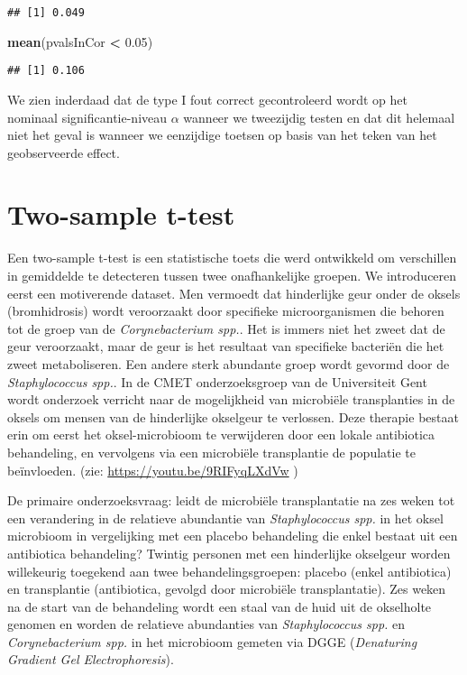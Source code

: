 \documentclass[12pt,dutch,coursenotes]{book}
\newenvironment{Shaded}{\begin{snugshade}}{\end{snugshade}}
\newcommand{\KeywordTok}[1]{\textcolor[rgb]{0.13,0.29,0.53}{\textbf{#1}}}
\newcommand{\FloatTok}[1]{\textcolor[rgb]{0.00,0.00,0.81}{#1}}
\newcommand{\StringTok}[1]{\textcolor[rgb]{0.31,0.60,0.02}{#1}}
\newcommand{\OperatorTok}[1]{\textcolor[rgb]{0.81,0.36,0.00}{\textbf{#1}}}
\newcommand{\NormalTok}[1]{#1}
\theoremstyle{definition}
\theoremstyle{definition}
\theoremstyle{definition}
\theoremstyle{remark}
\begin{document}
\begin{verbatim}
## [1] 0.049
\end{verbatim}

\begin{Shaded}
\begin{Highlighting}[]
\KeywordTok{mean}\NormalTok{(pvalsInCor }\OperatorTok{<}\StringTok{ }\FloatTok{0.05}\NormalTok{)}
\end{Highlighting}
\end{Shaded}

\begin{verbatim}
## [1] 0.106
\end{verbatim}

We zien inderdaad dat de type I fout correct gecontroleerd wordt op het
nominaal significantie-niveau \(\alpha\) wanneer we tweezijdig testen en
dat dit helemaal niet het geval is wanneer we eenzijdige toetsen op
basis van het teken van het geobserveerde effect.

\section{Two-sample t-test}\label{two-sample-t-test}

Een two-sample t-test is een statistische toets die werd ontwikkeld om
verschillen in gemiddelde te detecteren tussen twee onafhankelijke
groepen. We introduceren eerst een motiverende dataset. Men vermoedt dat
hinderlijke geur onder de oksels (bromhidrosis) wordt veroorzaakt door
specifieke microorganismen die behoren tot de groep van de
\emph{Corynebacterium spp.}. Het is immers niet het zweet dat de geur
veroorzaakt, maar de geur is het resultaat van specifieke bacteriën die
het zweet metaboliseren. Een andere sterk abundante groep wordt gevormd
door de \emph{Staphylococcus spp.}. In de CMET onderzoeksgroep van de
Universiteit Gent wordt onderzoek verricht naar de mogelijkheid van
microbiële transplanties in de oksels om mensen van de hinderlijke
okselgeur te verlossen. Deze therapie bestaat erin om eerst het
oksel-microbioom te verwijderen door een lokale antibiotica behandeling,
en vervolgens via een microbiële transplantie de populatie te
beïnvloeden. (zie: \url{https://youtu.be/9RIFyqLXdVw} )

De primaire onderzoeksvraag: leidt de microbiële transplantatie na zes
weken tot een verandering in de relatieve abundantie van
\emph{Staphylococcus spp.} in het oksel microbioom in vergelijking met
een placebo behandeling die enkel bestaat uit een antibiotica
behandeling? Twintig personen met een hinderlijke okselgeur worden
willekeurig toegekend aan twee behandelingsgroepen: placebo (enkel
antibiotica) en transplantie (antibiotica, gevolgd door microbiële
transplantatie). Zes weken na de start van de behandeling wordt een
staal van de huid uit de okselholte genomen en worden de relatieve
abundanties van \emph{Staphylococcus spp.} en \emph{Corynebacterium
spp.} in het microbioom gemeten via DGGE (\emph{Denaturing Gradient Gel
Electrophoresis}).
\end{document}

